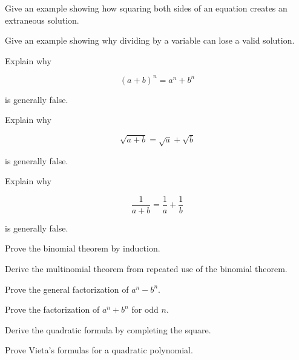 \begin{exercise}[3]
Give an example showing how squaring both sides of an equation creates an
extraneous solution.
\end{exercise}

\begin{exercise}[3]
Give an example showing why dividing by a variable can lose a valid solution.
\end{exercise}

\begin{exercise}[3]
Explain why

\[
(a+b)^n=a^n+b^n
\]

is generally false.
\end{exercise}

\begin{exercise}[3]
Explain why

\[
\sqrt{a+b}
=
\sqrt a+\sqrt b
\]

is generally false.
\end{exercise}

\begin{exercise}[3]
Explain why

\[
\frac1{a+b}
=
\frac1a+\frac1b
\]

is generally false.
\end{exercise}

\begin{exercise}[4]
Prove the binomial theorem by induction.
\end{exercise}

\begin{exercise}[4]
Derive the multinomial theorem from repeated use of the binomial theorem.
\end{exercise}

\begin{exercise}[4]
Prove the general factorization of \(a^n-b^n\).
\end{exercise}

\begin{exercise}[4]
Prove the factorization of \(a^n+b^n\) for odd \(n\).
\end{exercise}

\begin{exercise}[4]
Derive the quadratic formula by completing the square.
\end{exercise}

\begin{exercise}[4]
Prove Vieta's formulas for a quadratic polynomial.
\end{exercise}

